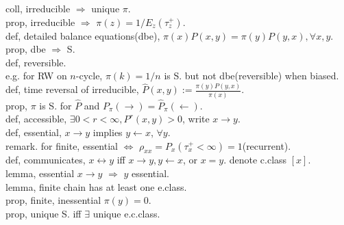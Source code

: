\documentclass[paper=a4, fontsize=11pt]{scrartcl} %
\numberwithin{equation}{section} %
\numberwithin{figure}{section} %
\numberwithin{table}{section} %
\begin{document}
coll, irreducible $\Rightarrow$ unique $\pi$.\\
prop, irreducible $\Rightarrow$ $\pi(z)=1/E_z(\tau_z^+)$.\\
def, detailed balance equations(dbe), $\pi(x)P(x,y)=\pi(y)P(y,x),\forall x,y$.\\
prop, dbe $\Rightarrow$ S.\\
def, reversible.\\
e.g. for RW on $n$-cycle, $\pi(k)=1/n$ is S. but not dbe(reversible) when biased.\\
def, time reversal of irreducible, $\widehat{P}(x,y):=\frac{\pi(y)P(y,x)}{\pi(x)}$.\\
prop, $\pi$ is S. for $\widehat{P}$ and $P_{\pi}(\rightarrow)=\widehat{P}_\pi(\leftarrow)$.\\
def, accessible, $\exists 0<r<\infty, P^r(x,y)>0$, write $x\rightarrow y$.\\
def, essential, $x\rightarrow y$ implies $y\leftarrow x$, $\forall y$.\\
remark. for finite, essential $\Leftrightarrow$ $\rho_{xx}=P_x(\tau_x^+<\infty)=1$(recurrent).\\
def, communicates, $x \leftrightarrow y$ iff $x\rightarrow y,y\leftarrow x$, or $x=y$. denote c.class $[x]$.\\
lemma, essential $x\rightarrow y$ $\Rightarrow$ $y$ essential.\\
lemma, finite chain has at least one e.class.\\
prop, finite, inessential $\pi(y)=0$.\\
prop, unique S. iff $\exists$ unique e.c.class.\\
\end{document}
